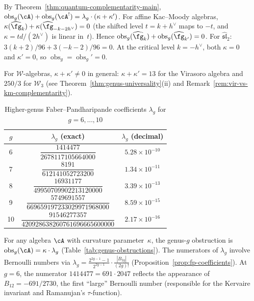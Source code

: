 \begin{remark}\label{rem:genus-complementarity}
By Theorem~\ref{thm:quantum-complementarity-main},
$\operatorname{obs}_g(\cA) + \operatorname{obs}_g(\cA^!)
 = \lambda_g \cdot (\kappa + \kappa')$.
For affine Kac--Moody algebras,
$\kappa(\widehat{\fg}_k) + \kappa(\widehat{\fg}_{-k-2h^\vee}) = 0$
(the shifted level $t = k + h^\vee$ maps to $-t$, and
$\kappa = td/(2h^\vee)$ is linear in~$t$).
Hence $\operatorname{obs}_g(\widehat{\fg}_k)
 + \operatorname{obs}_g(\widehat{\fg}_{k'}) = 0$.
For $\widehat{\mathfrak{sl}}_2$:
$3(k{+}2)/96 + 3(-k{-}2)/96 = 0$.
At the critical level $k = -h^\vee$, both $\kappa = 0$ and $\kappa' = 0$,
so $\operatorname{obs}_g = \operatorname{obs}_g' = 0$.

For $\mathcal{W}$-algebras, $\kappa + \kappa' \neq 0$ in general:
$\kappa + \kappa' = 13$ for the Virasoro algebra and $250/3$ for
$\mathcal{W}_3$ (see Theorem~\ref{thm:genus-universality}(ii)
and Remark~\ref{rem:vir-vs-km-complementarity}).
\end{remark}

\begin{table}[ht]
\centering
\caption{Higher-genus Faber--Pandharipande coefficients $\lambda_g$ for $g = 6, \ldots, 10$}
\label{tab:genus-obstructions-high}
\renewcommand{\arraystretch}{1.5}
{\footnotesize
\begin{tabular}{|c|c|c|}
\hline
$g$ & $\lambda_g$ (exact) & $\lambda_g$ (decimal) \\
\hline
6 & $\dfrac{1414477}{2678117105664000}$ & $5.28 \times 10^{-10}$ \\[6pt]
\hline
7 & $\dfrac{8191}{612141052723200}$ & $1.34 \times 10^{-11}$ \\[6pt]
\hline
8 & $\dfrac{16931177}{49950709902213120000}$ & $3.39 \times 10^{-13}$ \\[6pt]
\hline
9 & $\dfrac{5749691557}{669659197233029971968000}$ & $8.59 \times 10^{-15}$ \\[6pt]
\hline
10 & $\dfrac{91546277357}{420928638260761696665600000}$ & $2.17 \times 10^{-16}$ \\[6pt]
\hline
\end{tabular}
}
\end{table}

\noindent
For any algebra $\cA$ with curvature parameter~$\kappa$,
the genus-$g$ obstruction is $\operatorname{obs}_g(\cA) = \kappa \cdot \lambda_g$
(Table~\ref{tab:genus-obstructions}).  The numerators of
$\lambda_g$ involve Bernoulli numbers via
$\lambda_g = \tfrac{2^{2g-1}-1}{2^{2g-1}} \cdot
\tfrac{|B_{2g}|}{(2g)!}$
(Proposition~\ref{prop:fp-coefficients}).
At $g = 6$, the numerator $1414477 = 691 \cdot 2047$ reflects the
appearance of $B_{12} = -691/2730$, the first ``large'' Bernoulli
number (responsible for the Kervaire invariant and Ramanujan's
$\tau$-function).

